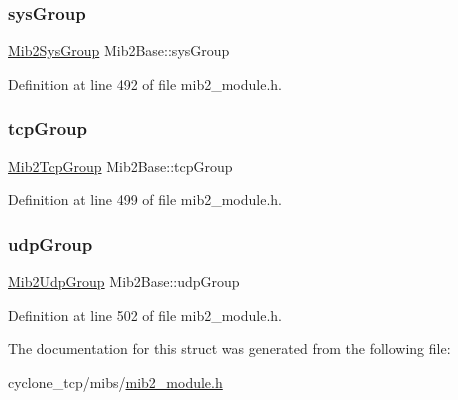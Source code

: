 \mbox{\label{structMib2Base_a5add1e15c1e18ffe496113704d5c91e3}} 
\subsubsection{\texorpdfstring{sys\+Group}{sysGroup}}
{\footnotesize\ttfamily \hyperlink{structMib2SysGroup}{Mib2\+Sys\+Group} Mib2\+Base\+::sys\+Group}



Definition at line 492 of file mib2\+\_\+module.\+h.

\mbox{\label{structMib2Base_a55b825d40c1818285f93fc8a1db2786b}} 
\subsubsection{\texorpdfstring{tcp\+Group}{tcpGroup}}
{\footnotesize\ttfamily \hyperlink{structMib2TcpGroup}{Mib2\+Tcp\+Group} Mib2\+Base\+::tcp\+Group}



Definition at line 499 of file mib2\+\_\+module.\+h.

\mbox{\label{structMib2Base_a8a3a1848dd611e017aa9d4de20034840}} 
\subsubsection{\texorpdfstring{udp\+Group}{udpGroup}}
{\footnotesize\ttfamily \hyperlink{structMib2UdpGroup}{Mib2\+Udp\+Group} Mib2\+Base\+::udp\+Group}



Definition at line 502 of file mib2\+\_\+module.\+h.



The documentation for this struct was generated from the following file\+:\begin{DoxyCompactItemize}
\item 
cyclone\+\_\+tcp/mibs/\hyperlink{mib2__module_8h}{mib2\+\_\+module.\+h}\end{DoxyCompactItemize}
